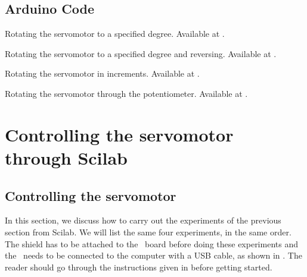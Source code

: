 \subsection{Arduino Code}
\lstset{style=mystyle}
\label{sec:servo-arduino-code}

\begin{ardcode}
   {Rotating
    the servomotor to a specified degree.  Available at
    .}
  \label{ard:servo-init}
  
\end{ardcode}

\begin{ardcode}
   {Rotating
    the servomotor to a specified degree and reversing.  Available at
    .}
  \label{ard:servo-reverse}
  
\end{ardcode}

\begin{ardcode}
   {Rotating the
    servomotor in increments.  Available at
    .}
  \label{ard:servo-loop}
  
\end{ardcode}

\begin{ardcode}
  {Rotating the servomotor through the potentiometer.  Available at
    .}
  \label{ard:servo-pot}
  
\end{ardcode}

\section{Controlling the servomotor through Scilab}
\subsection{Controlling the servomotor}
\label{sec:servo-sci}
In this section, we discuss how to carry out the experiments of the
previous section from Scilab. We will list the same four experiments,
in the same order.  The shield has to be attached to the \arduino\ board
before doing these experiments and the \arduino\ needs to be connected to the computer 
with a USB cable, as shown in .
The reader should go through the instructions given in
 before getting started. 


